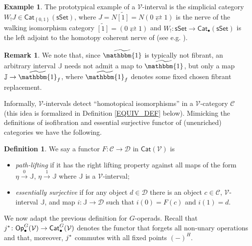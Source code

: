 \documentclass[a4paper,10pt
,draft
]{article}%
\numberwithin{equation}{section}
\numberwithin{figure}{section}
\theoremstyle{definition} %
\newtheorem{definition}[equation]{Definition}%
\newtheorem{example}[equation]{Example}%
\newtheorem{remark}[equation]{Remark}%
\newcommand{\set}[1]{\left\{#1\right\}}%
\newcommand{\sSet}{\ensuremath{\mathsf{sSet}}}%
\newcommand{\Cat}{\mathsf{Cat}}
\newcommand{\V}{\ensuremath{\mathcal V}}
\newcommand{\1}{\ensuremath{\mathbbm 1}}%
\begin{document}
\begin{example}
	The prototypical example of a $\V$-interval is the simplicial category $W_!J \in \Cat_{\set{0,1}}(\sSet)$,
	where
	$J = N \widetilde{[1]} = N(0 \rightleftarrows 1) $ is the nerve of the walking isomorphism category 
	$\widetilde{[1]} =  (0 \rightleftarrows 1)$ and
	$W_! \colon \sSet \to \Cat_{\bullet}(\sSet)$ is the left adjoint to the homotopy coherent nerve
	of \cite{Cor82} (see e.g. \cite[\S 1]{Joy02}).
\end{example}



\begin{remark}
	We note that, since $\widetilde{\mathbbm{1}}$ is typically not fibrant,
	an arbitrary interval $\mathbb{J}$
	needs not admit a map to $\widetilde{\mathbbm{1}}$,
	but only a map $\mathbb{J} \to \widetilde{\mathbbm{1}}_f$,
	where $\widetilde{\mathbbm{1}}_f$ denotes some fixed chosen fibrant replacement.
\end{remark}



Informally, $\V$-intervals detect ``homotopical isomorphisms'' in a $\V$-category $\mathcal{C}$ 
(this idea is formalized in Definition \ref{EQUIV_DEF} below).
Mimicking the definitions of isofibration and essential surjective functor of (unenriched) categories we have the following.



\begin{definition}\label{PL_ES_DEFN}
We say a functor $F: \mathcal C \to \mathcal D$ in $\Cat(\V)$ is
\begin{itemize}
\item \textit{path-lifting}
	if it has the right lifting property against all maps of the form
	$\eta \xrightarrow{0} \mathbb{J}$, $\eta \xrightarrow{1} \mathbb{J}$
	where $\mathbb{J}$ is a $\V$-interval;
\item \textit{essentially surjective} 
	if for any object $d \in \mathcal{D}$
	there is an object $c \in \mathcal{C}$,
	$\V$-interval $\mathbb{J}$,
	and map $i \colon \mathbb{J} \to \mathcal D$
	such that $i(0) = F(c)$ and $i(1)=d$.
      \end{itemize}
\end{definition}



We now adapt the previous definition for $G$-operads.
Recall that $j^{\**} \colon \mathsf{Op}^G_\bullet(\V) \to \mathsf{Cat}^G_{\bullet}(\V)$
denotes the functor that forgets all non-unary operations and that, moreover, 
$j^{\**}$ commutes with all fixed points $(-)^H$.
\end{document}
